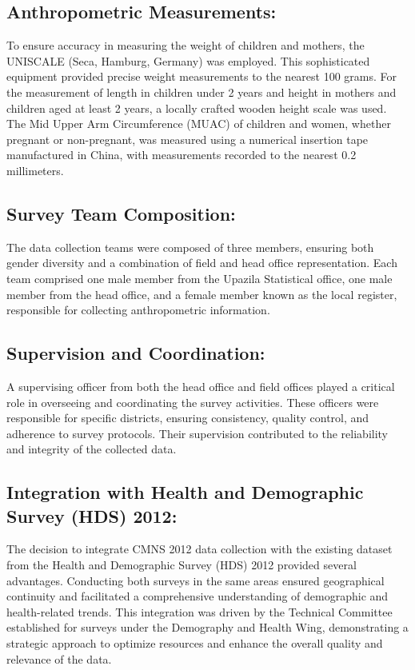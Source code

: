 \documentclass{report}
\begin{document}
\subsection{Anthropometric Measurements:}
To ensure accuracy in measuring the weight of children and mothers, the UNISCALE (Seca, Hamburg, Germany) was employed. This sophisticated equipment provided precise weight measurements to the nearest 100 grams. For the measurement of length in children under 2 years and height in mothers and children aged at least 2 years, a locally crafted wooden height scale was used. The Mid Upper Arm Circumference (MUAC) of children and women, whether pregnant or non-pregnant, was measured using a numerical insertion tape manufactured in China, with measurements recorded to the nearest 0.2 millimeters.

\subsection{Survey Team Composition:}
The data collection teams were composed of three members, ensuring both gender diversity and a combination of field and head office representation. Each team comprised one male member from the Upazila Statistical office, one male member from the head office, and a female member known as the local register, responsible for collecting anthropometric information.

\subsection{Supervision and Coordination:}
A supervising officer from both the head office and field offices played a critical role in overseeing and coordinating the survey activities. These officers were responsible for specific districts, ensuring consistency, quality control, and adherence to survey protocols. Their supervision contributed to the reliability and integrity of the collected data.

\subsection{Integration with Health and Demographic Survey (HDS) 2012:}
The decision to integrate CMNS 2012 data collection with the existing dataset from the Health and Demographic Survey (HDS) 2012 provided several advantages. Conducting both surveys in the same areas ensured geographical continuity and facilitated a comprehensive understanding of demographic and health-related trends. This integration was driven by the Technical Committee established for surveys under the Demography and Health Wing, demonstrating a strategic approach to optimize resources and enhance the overall quality and relevance of the data.
\end{document}
